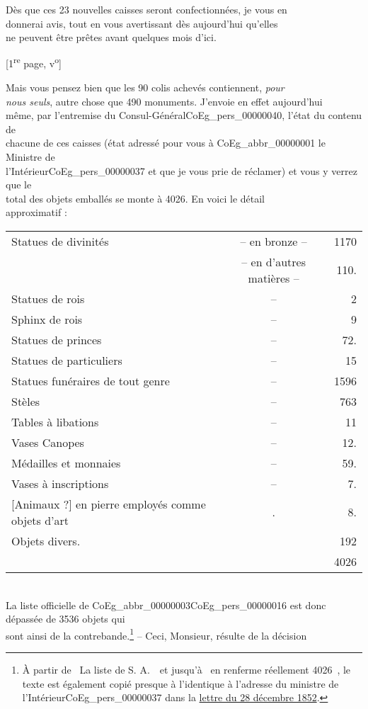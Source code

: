 \documentclass{book}
\begin{document}
Dès que ces 23 nouvelles caisses seront confectionnées, je vous en\\
donnerai avis, tout en vous avertissant dès aujourd’hui qu’elles\\
ne peuvent être prêtes avant quelques mois d’ici.
{\footnotesize\begin{center} {[1\textsuperscript{re} page, v\textsuperscript{o}]}\end{center}}
\indent Mais vous pensez bien que les 90 colis achevés contiennent, \textit{pour\\
nous seuls}, autre chose que 490 monuments. J’envoie en effet aujourd’hui\\
même, par l’entremise du Consul-Général\gls{CoEg_pers_00000040}, l’état du contenu de\\
chacune de ces caisses (état adressé pour vous à \gls{CoEg_abbr_00000001} le Ministre de\\
l’Intérieur\gls{CoEg_pers_00000037} et que je vous prie de réclamer) et vous y verrez que le\\
total des objets emballés se monte à 4026. En voici le détail\\
approximatif :\\
\begin{tabular}{ l c r }
  Statues de divinités & – en bronze	– & 1170 \\
 & – en d’autres matières 	– &	110.\\
  Statues de rois	&	–	&	2\\
Sphinx de rois	&	–	&	9\\
Statues de princes	& –	&	72.\\
Statues de particuliers	& – & 15\\
Statues funéraires de tout genre &	–	&	1596\\
Stèles	&	–	&	763\\
Tables à libations	& – &	11\\
Vases Canopes	&	–	&	12.\\
Médailles et monnaies	& –	&	59.\\
Vases à inscriptions	& –	&	7.\\
{[Animaux ?]} en pierre employés comme objets d’art &.&8.\\
Objets divers.&& 192\\
&&4026
\end{tabular}\\
\indent La liste officielle de \gls{CoEg_abbr_00000003}\gls{CoEg_pers_00000016} est donc dépassée de 3536 objets qui\\
sont ainsi de la contrebande.\footnote{À partir de \og ~La liste de S. A.~\fg ~et jusqu'à \og ~en renferme réellement 4026~\fg, le texte est également copié presque à l'identique à l'adresse du ministre de l'Intérieur\gls{CoEg_pers_00000037} dans la \hyperref[CoEg_Mariette_1852-12-28]{lettre du 28 décembre 1852}.} – Ceci, Monsieur, résulte de la décision\\
\end{document}
